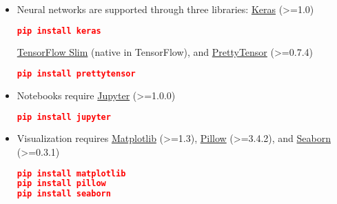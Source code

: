 \begin{itemize}
  \item Neural networks are supported through three libraries:
  \href{http://keras.io}{Keras} (>=1.0)
\begin{lstlisting}[language=JSON]
pip install keras
\end{lstlisting}
  \href{https://github.com/tensorflow/tensorflow/tree/master/tensorflow/contrib/slim}{TensorFlow Slim}
  (native in TensorFlow), and
  \href{https://github.com/google/prettytensor}{PrettyTensor} (>=0.7.4)
\begin{lstlisting}[language=JSON]
pip install prettytensor
\end{lstlisting}
  \item Notebooks require
  \href{http://jupyter.org}{Jupyter} (>=1.0.0)
\begin{lstlisting}[language=JSON]
pip install jupyter
\end{lstlisting}
  \item Visualization requires
  \href{http://matplotlib.org}{Matplotlib} (>=1.3),
  \href{https://pillow.readthedocs.io}{Pillow} (>=3.4.2), and
  \href{https://seaborn.pydata.org}{Seaborn} (>=0.3.1)
\begin{lstlisting}[language=JSON]
pip install matplotlib
pip install pillow
pip install seaborn
\end{lstlisting}
\end{itemize}
